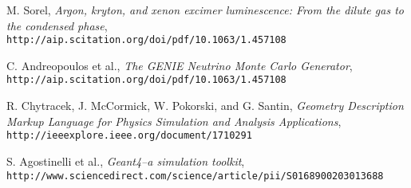 \documentclass[12pt]{article}
\begin{document}
\begin{thebibliography}{20}
  M. Sorel, \emph{Argon, kryton, and xenon excimer luminescence: From the dilute gas to the condensed phase}, \\
  \texttt{http://aip.scitation.org/doi/pdf/10.1063/1.457108}

  C. Andreopoulos et al., \emph{The GENIE Neutrino Monte Carlo Generator}, \\
  \texttt{http://aip.scitation.org/doi/pdf/10.1063/1.457108}

  R. Chytracek, J. McCormick, W. Pokorski, and G. Santin, \emph{Geometry Description Markup Language for Physics Simulation and Analysis Applications}, \\
  \texttt{http://ieeexplore.ieee.org/document/1710291}

  S. Agostinelli et al., \emph{Geant4--a simulation toolkit},\\
  \texttt{http://www.sciencedirect.com/science/article/pii/S0168900203013688}



\end{thebibliography}
\end{document}
